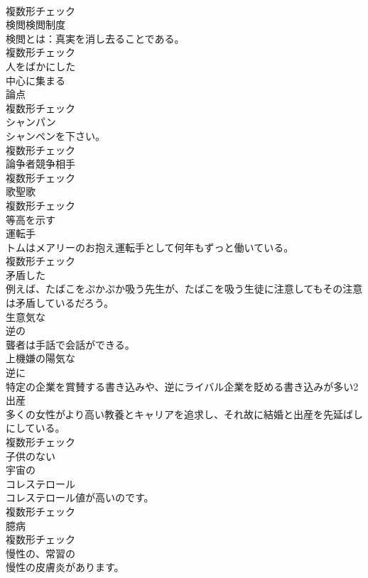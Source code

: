 \documentclass[8pt]{extreport}
\begin{document}
\begin{CJK}{UTF8}{min}
\\	複数形チェック
\\	[名詞]	検閲検閲制度	
\\	検閲とは：真実を消し去ることである。	
\\	複数形チェック
\\	[形容詞]	人をばかにした	
\\	[動詞]	中心に集まる	
\\	[名詞]	論点	
\\	複数形チェック
\\	[名詞]	シャンパン	
\\	シャンペンを下さい。	
\\	複数形チェック
\\	[名詞]	論争者競争相手	
\\	複数形チェック
\\	[名詞]	歌聖歌	
\\	複数形チェック
\\	[形容詞]	等高を示す	
\\	[名詞]	運転手	
\\	トムはメアリーのお抱え運転手として何年もずっと働いている。	
\\	複数形チェック
\\	[形容詞]	矛盾した	
\\	例えば、たばこをぷかぷか吸う先生が、たばこを吸う生徒に注意してもその注意は矛盾しているだろう。	
\\	[形容詞]	生意気な	
\\	[形容詞]	逆の	
\\	聾者は手話で会話ができる。	
\\	[形容詞]	上機嫌の陽気な	
\\	[副詞]	逆に	
\\	特定の企業を賞賛する書き込みや、逆にライバル企業を貶める書き込みが多い2
\\	[名詞]	出産	
\\	多くの女性がより高い教養とキャリアを追求し、それ故に結婚と出産を先延ばしにしている。	
\\	複数形チェック
\\	[形容詞]	子供のない	
\\	[形容詞]	宇宙の	
\\	[名詞]	コレステロール	
\\	コレステロール値が高いのです。	
\\	複数形チェック
\\	[名詞]	臆病	
\\	複数形チェック
\\	[形容詞]	慢性の、常習の	
\\	慢性の皮膚炎があります。	

\end{CJK}
\end{document}
